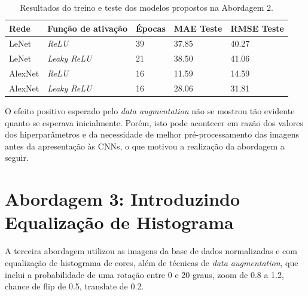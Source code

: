 	\begin{table}[!ht]
		\caption{Resultados do treino e teste dos modelos propostos na Abordagem 2.}
		\label{tab:results2}
		\begin{center}
			\begin{tabular}{l l l l l}
				\toprule
				Rede & Função de ativação & Épocas & MAE Teste & RMSE Teste \\
				\midrule
				LeNet & \emph{ReLU}  & 39 & 37.85 & 40.27 \\
				LeNet & \emph{Leaky ReLU} & 21 & 38.50 & 41.06 \\
				AlexNet & \emph{ReLU}  & 16 & 11.59 & 14.59 \\
				AlexNet & \emph{Leaky ReLU} & 16 & 28.06 & 31.81 \\
				\bottomrule
			\end{tabular}
		\end{center}
	\end{table}

	O efeito positivo esperado pelo \emph{data augmentation} não se mostrou tão evidente quanto se esperava inicialmente. Porém, isto pode acontecer em razão dos valores dos hiperparâmetros e da necessidade de melhor pré-processamento das imagens antes da apresentação às CNNs, o que motivou a realização da abordagem a seguir.


\section{Abordagem 3: Introduzindo Equalização de Histograma}%
	A terceira abordagem utilizou as imagens da base de dados normalizadas e com equalização de histograma de cores, além de técnicas de \emph{data augmentation}, que inclui a probabilidade de uma rotação entre 0 e 20 graus, zoom de 0.8 a 1.2, chance de flip de 0.5, translate de 0.2.



